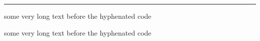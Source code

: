 \documentclass{article}
\begin{document}
\noindent\rule{\textwidth}{1pt}
some very long text before the hyphenated code

some very long text before the hyphenated code
\end{document}
